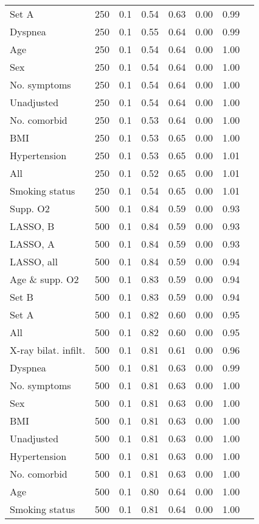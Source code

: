 \documentclass{article}
\begin{document}
{\begin{longtable}{lccccccc}
Set A & 250 & 0.1 & 0.54 & 0.63 & 0.00 & 0.99\\
Dyspnea & 250 & 0.1 & 0.55 & 0.64 & 0.00 & 0.99\\
Age & 250 & 0.1 & 0.54 & 0.64 & 0.00 & 1.00\\
Sex & 250 & 0.1 & 0.54 & 0.64 & 0.00 & 1.00\\
No. symptoms & 250 & 0.1 & 0.54 & 0.64 & 0.00 & 1.00\\
Unadjusted & 250 & 0.1 & 0.54 & 0.64 & 0.00 & 1.00\\
No. comorbid & 250 & 0.1 & 0.53 & 0.64 & 0.00 & 1.00\\
BMI & 250 & 0.1 & 0.53 & 0.65 & 0.00 & 1.00\\
Hypertension & 250 & 0.1 & 0.53 & 0.65 & 0.00 & 1.01\\
All & 250 & 0.1 & 0.52 & 0.65 & 0.00 & 1.01\\
Smoking status & 250 & 0.1 & 0.54 & 0.65 & 0.00 & 1.01\\ \midrule
Supp. O2 & 500 & 0.1 & 0.84 & 0.59 & 0.00 & 0.93\\
LASSO, B & 500 & 0.1 & 0.84 & 0.59 & 0.00 & 0.93\\
LASSO, A & 500 & 0.1 & 0.84 & 0.59 & 0.00 & 0.93\\
LASSO, all & 500 & 0.1 & 0.84 & 0.59 & 0.00 & 0.94\\
Age \& supp. O2 & 500 & 0.1 & 0.83 & 0.59 & 0.00 & 0.94\\
Set B & 500 & 0.1 & 0.83 & 0.59 & 0.00 & 0.94\\
Set A & 500 & 0.1 & 0.82 & 0.60 & 0.00 & 0.95\\
All & 500 & 0.1 & 0.82 & 0.60 & 0.00 & 0.95\\
X-ray bilat. infilt. & 500 & 0.1 & 0.81 & 0.61 & 0.00 & 0.96\\
Dyspnea & 500 & 0.1 & 0.81 & 0.63 & 0.00 & 0.99\\
No. symptoms & 500 & 0.1 & 0.81 & 0.63 & 0.00 & 1.00\\
Sex & 500 & 0.1 & 0.81 & 0.63 & 0.00 & 1.00\\
BMI & 500 & 0.1 & 0.81 & 0.63 & 0.00 & 1.00\\
Unadjusted & 500 & 0.1 & 0.81 & 0.63 & 0.00 & 1.00\\
Hypertension & 500 & 0.1 & 0.81 & 0.63 & 0.00 & 1.00\\
No. comorbid & 500 & 0.1 & 0.81 & 0.63 & 0.00 & 1.00\\
Age & 500 & 0.1 & 0.80 & 0.64 & 0.00 & 1.00\\
Smoking status & 500 & 0.1 & 0.81 & 0.64 & 0.00 & 1.00\\ \midrule

\end{longtable}}
\end{document}
